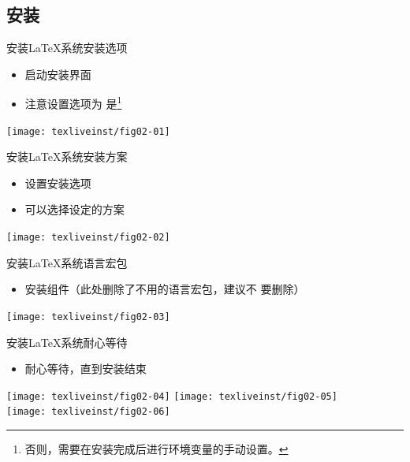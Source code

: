 \documentclass[xcolor=svgnames, t, 10pt]{ctexbeamer}%
\begin{document}
\subsection[安装]{安装}
\begin{frame}[t]{安装\LaTeX 系统}{安装选项}
  \begin{itemize}
  \item 启动安装界面
  \item 注意设置选项为
    \alert{是}\footnote[frame]{否则，需要在安装完成后进行环境变量的手动设置。}
  \end{itemize}
  \centering
  \texttt{[image: texliveinst/fig02-01]}
\end{frame}

\begin{frame}[t]{安装\LaTeX 系统}{安装方案}
  \begin{itemize}
  \item 设置安装选项
  \item 可以选择设定的方案
  \end{itemize}
  \centering
  \texttt{[image: texliveinst/fig02-02]}
\end{frame}

\begin{frame}[t]{安装\LaTeX 系统}{语言宏包}
  \begin{itemize}
  \item 安装组件（此处删除了不用的语言宏包，\alert{建议不
      要删除}）
  \end{itemize}
  \centering
  \texttt{[image: texliveinst/fig02-03]}
\end{frame}

\begin{frame}[t]{安装\LaTeX 系统}{耐心等待}
    \begin{itemize}
    \item 耐心等待，直到安装结束
    \end{itemize}
    \centering
    \texttt{[image: texliveinst/fig02-04]}
    \hfill
    \texttt{[image: texliveinst/fig02-05]}
    \\[2em]
    \texttt{[image: texliveinst/fig02-06]}
\end{frame}
\end{document}

